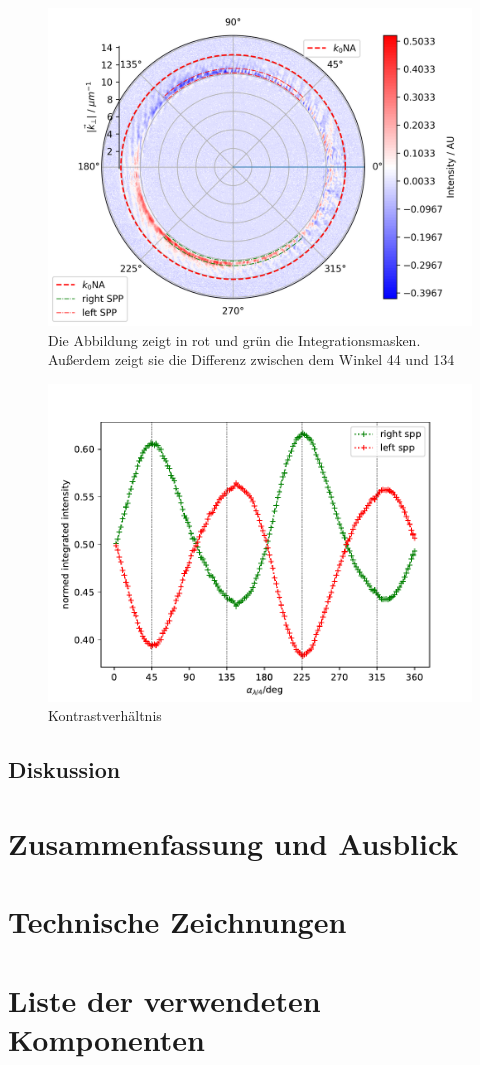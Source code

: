 \documentclass{article}
\begin{document}
	\begin{figure}[htbp] 
	\centering
	\includegraphics[width=\textwidth]{figures/polar_diff_mask4.png}
	\caption{Die Abbildung zeigt in rot und grün die Integrationsmasken. Außerdem zeigt sie die Differenz zwischen dem Winkel 44 und 134}
	\label{fig:polar_diff_mask4}
	\end{figure}
	\begin{figure}[htbp] 
	\centering
	\includegraphics[width=\textwidth]{figures/integrated_intesity4.pdf}
	\caption{Kontrastverhältnis}
	\label{fig:integrated_intesity4}
\end{figure}
	\subsection{Diskussion}
\section{Zusammenfassung und Ausblick}


\appendix

\section{Technische Zeichnungen}
\section{Liste der verwendeten Komponenten}

	
\end{document}
